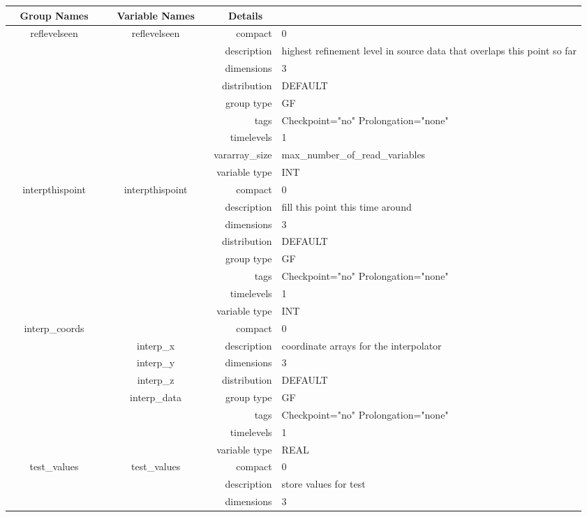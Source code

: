 \vspace{5mm}

\begin{tabular*}{150mm}{|c|c@{\extracolsep{\fill}}|rl|} \hline 
~ {\bf Group Names} ~ & ~ {\bf Variable Names} ~  &{\bf Details} ~ & ~\\ 
\hline 
reflevelseen & reflevelseen & compact & 0 \\ 
 &  & description & highest refinement level in source data that overlaps this point so far \\ 
 &  & dimensions & 3 \\ 
 &  & distribution & DEFAULT \\ 
 &  & group type & GF \\ 
 &  & tags & Checkpoint="no" Prolongation="none" \\ 
 &  & timelevels & 1 \\ 
 &  & vararray\_size & max\_number\_of\_read\_variables \\ 
 &  & variable type & INT \\ 
\hline 
interpthispoint & interpthispoint & compact & 0 \\ 
 &  & description & fill this point this time around \\ 
 &  & dimensions & 3 \\ 
 &  & distribution & DEFAULT \\ 
 &  & group type & GF \\ 
 &  & tags & Checkpoint="no" Prolongation="none" \\ 
 &  & timelevels & 1 \\ 
 &  & variable type & INT \\ 
\hline 
interp\_coords &  & compact & 0 \\ 
 & interp\_x & description & coordinate arrays for the interpolator \\ 
 & interp\_y & dimensions & 3 \\ 
 & interp\_z & distribution & DEFAULT \\ 
 & interp\_data & group type & GF \\ 
 &  & tags & Checkpoint="no" Prolongation="none" \\ 
 &  & timelevels & 1 \\ 
 &  & variable type & REAL \\ 
\hline 
test\_values & test\_values & compact & 0 \\ 
 &  & description & store values for test \\ 
 &  & dimensions & 3 \\ 

\end{tabular*}
